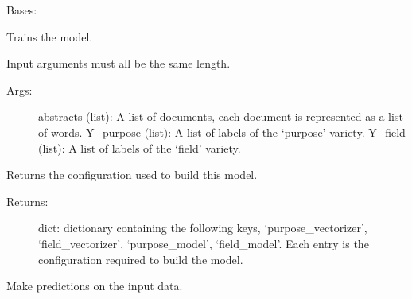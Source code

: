 \documentclass[letterpaper,10pt,english]{sphinxmanual}
\begin{document}

\begin{fulllineitems}
\label{\detokenize{KUHERD:KUHERD.Models.PurposeFieldModel}}
Bases: 

\begin{fulllineitems}
\label{\detokenize{KUHERD:KUHERD.Models.PurposeFieldModel.fit}}
Trains the model.

Input arguments must all be the same length.
\begin{description}
\item[{Args:}] \leavevmode
abstracts (list): A list of documents, each document is represented as a list of words.
Y\_purpose (list): A list of labels of the `purpose' variety.
Y\_field (list): A list of labels of the `field' variety.

\end{description}

\end{fulllineitems}


\begin{fulllineitems}
\label{\detokenize{KUHERD:KUHERD.Models.PurposeFieldModel.get_config}}
Returns the configuration used to build this model.
\begin{description}
\item[{Returns:}] \leavevmode
dict: dictionary containing the following keys, `purpose\_vectorizer', `field\_vectorizer', `purpose\_model', `field\_model'. Each entry is the configuration required to build the model.

\end{description}

\end{fulllineitems}


\begin{fulllineitems}
\label{\detokenize{KUHERD:KUHERD.Models.PurposeFieldModel.predict}}
Make predictions on the input data.


\end{fulllineitems}
\end{fulllineitems}
\end{document}
